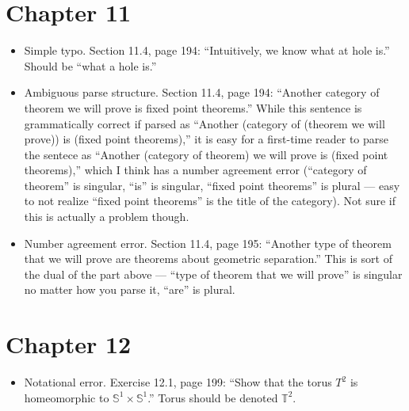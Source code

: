 \documentclass{fkletter}
\begin{document}
\section*{Chapter 11}
\begin{itemize}
  \item Simple typo. Section 11.4, page 194: ``Intuitively, we know what
    {\color{red} at} hole is.'' Should be ``what {\color{green} a} hole is.''
  \item Ambiguous parse structure. Section 11.4, page 194: ``Another category of
    theorem we will prove is fixed point theorems.'' While this sentence is
    grammatically correct if parsed as ``Another (category of (theorem we will
    prove)) is (fixed point theorems),'' it is easy for a first-time reader to
    parse the sentece as ``Another (category of theorem) we will prove is (fixed
    point theorems),'' which I think has a number agreement error (``category of
    theorem'' is singular, ``is'' is singular, ``fixed point theorems'' is
    plural --- easy to not realize ``fixed point theorems'' is the title of the
    category). Not sure if this is actually a problem though.
  \item Number agreement error. Section 11.4, page 195: ``Another type of
    theorem that we will prove {\color{red} are} theorems about geometric
    separation.'' This is sort of the dual of the part above --- ``type of
    theorem that we will prove'' is singular no matter how you parse it, ``are''
    is plural.
\end{itemize}
\section*{Chapter 12}
\begin{itemize}
  \item Notational error. Exercise 12.1, page 199: ``Show that the torus
    {\color{red}$T^2$} is homeomorphic to $\mathbb{S}^1 \times \mathbb{S}^1$.''
    Torus should be denoted $\mathbb{T}^2$.
\end{itemize}
\end{document}
